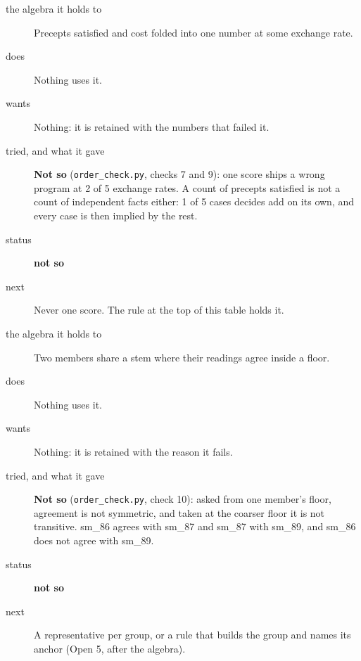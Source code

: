 \begin{description}
\item[{the algebra it holds to}] Precepts satisfied and cost folded into one number at some exchange rate.
\item[{does}] Nothing uses it.
\item[{wants}] Nothing: it is retained with the numbers that failed it.
\item[{tried, and what it gave}] \textbf{Not so} (\texttt{order\_\allowbreak{}check.\allowbreak{}py}, checks 7 and 9): one score ships a wrong program at 2 of 5 exchange rates. A count of precepts satisfied is not a count of independent facts either: 1 of 5 cases decides add on its own, and every case is then implied by the rest.
\item[{status}] \textbf{not so}
\item[{next}] Never one score. The rule at the top of this table holds it.
\end{description}

\begin{description}
\item[{the algebra it holds to}] Two members share a stem where their readings agree inside a floor.
\item[{does}] Nothing uses it.
\item[{wants}] Nothing: it is retained with the reason it fails.
\item[{tried, and what it gave}] \textbf{Not so} (\texttt{order\_\allowbreak{}check.\allowbreak{}py}, check 10): asked from one member's floor, agreement is not symmetric, and taken at the coarser floor it is not transitive. sm\_\allowbreak{}86 agrees with sm\_\allowbreak{}87 and sm\_\allowbreak{}87 with sm\_\allowbreak{}89, and sm\_\allowbreak{}86 does not agree with sm\_\allowbreak{}89.
\item[{status}] \textbf{not so}
\item[{next}] A representative per group, or a rule that builds the group and names its anchor (Open 5, after the algebra).
\end{description}

